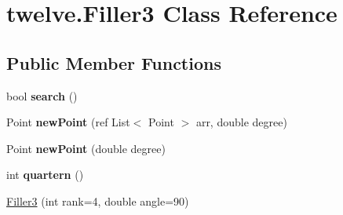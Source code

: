\hypertarget{classtwelve_1_1_filler3}{}\section{twelve.\+Filler3 Class Reference}
\label{classtwelve_1_1_filler3}
\subsection*{Public Member Functions}
\begin{DoxyCompactItemize}
\item 
\hypertarget{classtwelve_1_1_filler3_af4f4768c36421a10016b22b440ba0c61}{}bool {\bfseries search} ()\label{classtwelve_1_1_filler3_af4f4768c36421a10016b22b440ba0c61}

\item 
\hypertarget{classtwelve_1_1_filler3_a11430ce8d4476fda83c92665ae9672a1}{}Point {\bfseries new\+Point} (ref List$<$ Point $>$ arr, double degree)\label{classtwelve_1_1_filler3_a11430ce8d4476fda83c92665ae9672a1}

\item 
\hypertarget{classtwelve_1_1_filler3_a379abecc1e27ee2162e55c5aa006ceff}{}Point {\bfseries new\+Point} (double degree)\label{classtwelve_1_1_filler3_a379abecc1e27ee2162e55c5aa006ceff}

\item 
\hypertarget{classtwelve_1_1_filler3_a9122e4bbd751fc1220e54f3b03c3dfd7}{}int {\bfseries quartern} ()\label{classtwelve_1_1_filler3_a9122e4bbd751fc1220e54f3b03c3dfd7}

\item 
\hyperlink{classtwelve_1_1_filler3_a7576e5701848fcf85d1d45e87f0976b3}{Filler3} (int rank=4, double angle=90)
\end{DoxyCompactItemize}
